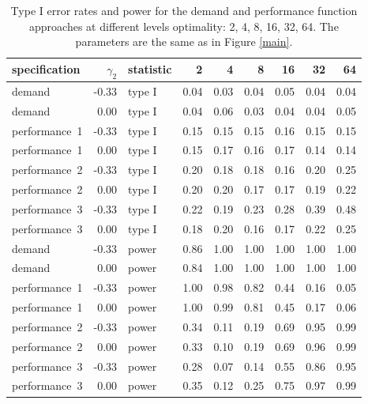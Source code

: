 \begin{table}[ht]
\centering
\begingroup\footnotesize
\begin{tabular}{lrlrrrrrr}
  \hline
specification & $\gamma_2$ & statistic & 2 & 4 & 8 & 16 & 32 & 64 \\ 
  \hline
demand & -0.33 & type I & 0.04 & 0.03 & 0.04 & 0.05 & 0.04 & 0.04 \\ 
  demand & 0.00 & type I & 0.04 & 0.06 & 0.03 & 0.04 & 0.04 & 0.05 \\ 
  performance~1 & -0.33 & type I & 0.15 & 0.15 & 0.15 & 0.16 & 0.15 & 0.15 \\ 
  performance~1 & 0.00 & type I & 0.15 & 0.17 & 0.16 & 0.17 & 0.14 & 0.14 \\ 
  performance~2 & -0.33 & type I & 0.20 & 0.18 & 0.18 & 0.16 & 0.20 & 0.25 \\ 
  performance~2 & 0.00 & type I & 0.20 & 0.20 & 0.17 & 0.17 & 0.19 & 0.22 \\ 
  performance~3 & -0.33 & type I & 0.22 & 0.19 & 0.23 & 0.28 & 0.39 & 0.48 \\ 
  performance~3 & 0.00 & type I & 0.18 & 0.20 & 0.16 & 0.17 & 0.22 & 0.25 \\ 
  demand & -0.33 & power & 0.86 & 1.00 & 1.00 & 1.00 & 1.00 & 1.00 \\ 
  demand & 0.00 & power & 0.84 & 1.00 & 1.00 & 1.00 & 1.00 & 1.00 \\ 
  performance~1 & -0.33 & power & 1.00 & 0.98 & 0.82 & 0.44 & 0.16 & 0.05 \\ 
  performance~1 & 0.00 & power & 1.00 & 0.99 & 0.81 & 0.45 & 0.17 & 0.06 \\ 
  performance~2 & -0.33 & power & 0.34 & 0.11 & 0.19 & 0.69 & 0.95 & 0.99 \\ 
  performance~2 & 0.00 & power & 0.33 & 0.10 & 0.19 & 0.69 & 0.96 & 0.99 \\ 
  performance~3 & -0.33 & power & 0.28 & 0.07 & 0.14 & 0.55 & 0.86 & 0.95 \\ 
  performance~3 & 0.00 & power & 0.35 & 0.12 & 0.25 & 0.75 & 0.97 & 0.99 \\ 
   \hline
\end{tabular}
\endgroup
\caption{Type I error rates and power for the demand 
             and performance function approaches at different
             levels optimality: 2, 4, 8, 16, 32, 64. The 
             parameters are the same as in Figure
             \ref{main}.} 
\label{main-table}
\end{table}
